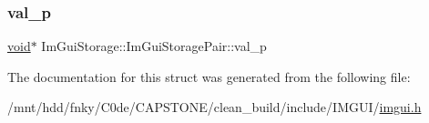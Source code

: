 \mbox{\label{structImGuiStorage_1_1ImGuiStoragePair_a9b0963410770bb225b1eef58d89ba2ec}} 
\subsubsection{\texorpdfstring{val\+\_\+p}{val\_p}}
{\footnotesize\ttfamily \hyperlink{imgui__impl__opengl3__loader_8h_ac668e7cffd9e2e9cfee428b9b2f34fa7}{void}$\ast$ Im\+Gui\+Storage\+::\+Im\+Gui\+Storage\+Pair\+::val\+\_\+p}



The documentation for this struct was generated from the following file\+:\begin{DoxyCompactItemize}
\item 
/mnt/hdd/fnky/\+C0de/\+C\+A\+P\+S\+T\+O\+N\+E/clean\+\_\+build/include/\+I\+M\+G\+U\+I/\hyperlink{imgui_8h}{imgui.\+h}\end{DoxyCompactItemize}
